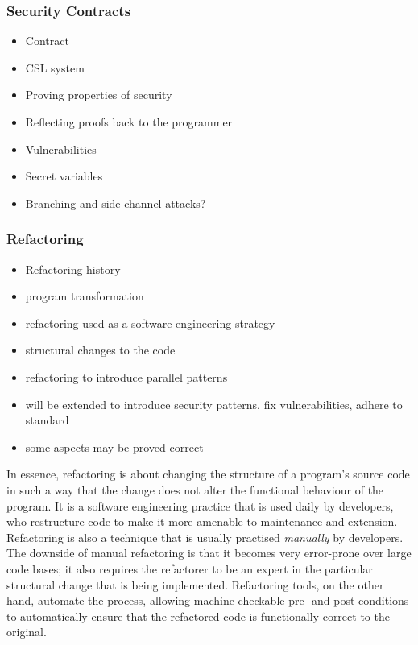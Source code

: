 \documentclass[a4paper,11pt]{article}
\begin{document}
\subsubsection{Security Contracts}
\begin{itemize}
    \item Contract
    \item CSL system
    \item Proving properties of security
    \item Reflecting proofs back to the programmer
    \item Vulnerabilities
    \item Secret variables
    \item Branching and side channel attacks?
\end{itemize}

\subsubsection{Refactoring}
\begin{itemize}
	\item Refactoring history
	\item program transformation
	\item refactoring used as a software engineering strategy
	\item structural changes to the code
	\item refactoring to introduce parallel patterns
	\item will be extended to introduce security patterns, fix vulnerabilities, adhere to standard
	\item some aspects may be proved correct
\end{itemize}

In essence, refactoring is about changing the structure of a program's source code in such a way that the change does not alter the functional behaviour of the program. It is a software engineering practice that is used daily by developers, who restructure code to make it more amenable to maintenance and extension. Refactoring is also a technique that is usually practised \emph{manually} by developers. The downside of manual refactoring is that it becomes very error-prone over large code bases; it also requires the refactorer to be an expert in the particular structural change that is being implemented. Refactoring tools, on the other hand, automate the process, allowing machine-checkable pre- and post-conditions to automatically ensure that the refactored code is functionally correct to the original. 
\end{document}
